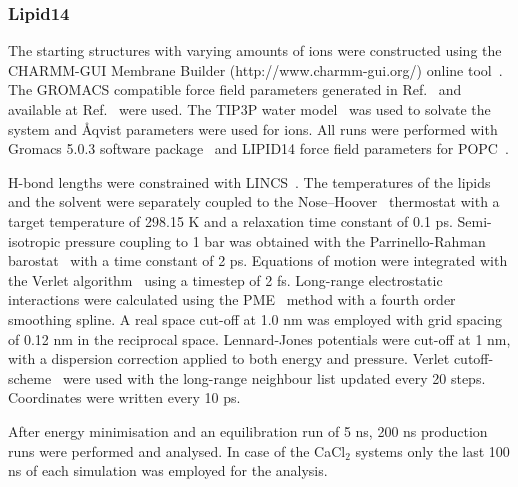 \documentclass[twoside,twocolumn,9pt]{article}
\begin{document}
\subsubsection{Lipid14}
The starting structures with varying amounts of ions were constructed using the CHARMM-GUI Membrane Builder (http://www.charmm-gui.org/) 
online tool~\cite{lee15}. The GROMACS compatible force field parameters generated in Ref.~ and 
available at Ref.~ were used. 
The TIP3P water model~\cite{jorgensen83} was used to solvate the system and \r{A}qvist \cite{aqvist90} parameters were used for ions.
All runs were performed with Gromacs 5.0.3 software package~\cite{abraham15}
and LIPID14 force field parameters for POPC~\cite{dickson14}. 

H-bond lengths were constrained with LINCS~\cite{hess97,hess07}. The temperatures of the lipids and the solvent were separately coupled to the 
Nose--Hoover~\cite{nose84,hoover85} thermostat with a target temperature of 298.15 K and a relaxation time constant of 0.1 ps. Semi-isotropic pressure 
coupling to 1 bar was obtained with the Parrinello-Rahman barostat~\cite{parrinello81} with a time constant of 2 ps. Equations of motion were integrated 
with the Verlet algorithm~\cite{pall13} using a timestep of 2 fs. Long-range electrostatic interactions were calculated using the PME~\cite{darden93,essman95} method 
with a fourth order smoothing spline. A real space cut-off at 1.0 nm was employed with grid spacing of 0.12 nm in the reciprocal space. 
Lennard-Jones potentials were cut-off at 1 nm, with a dispersion correction applied to both energy and pressure. Verlet cutoff-scheme~\cite{pall13} 
were used with the long-range neighbour list updated every 20 steps. Coordinates were written every 10 ps.

After energy minimisation and an equilibration run of 5 ns, 200 ns production runs were performed and analysed. In case of the CaCl$_2$ systems 
only the last 100 ns of each simulation was employed for the analysis.
\end{document}
